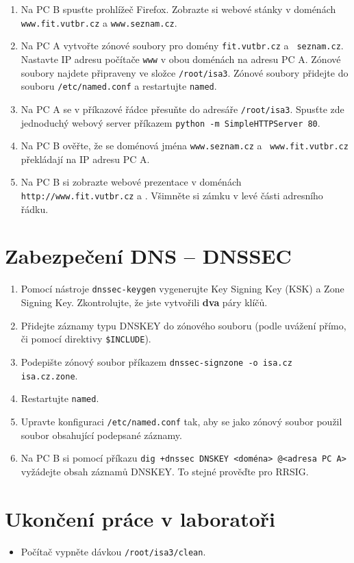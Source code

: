 \begin{enumerate}
  \item Na PC B spusťte prohlížeč Firefox. Zobrazte si webové stánky v
    doménách {\tt www.fit.vutbr.cz} a {\tt www.seznam.cz}.

  \item Na PC A vytvořte zónové soubory pro domény {\tt fit.vutbr.cz} a {\tt
    seznam.cz}. Nastavte IP adresu počítače {\tt www} v obou doménách na adresu
    PC A. Zónové soubory najdete připraveny ve složce {\tt /root/isa3}. Zónové
    soubory přidejte do souboru {\tt /etc/named.conf} a restartujte
    {\tt named}.

  \item Na PC A se v příkazové řádce přesuňte do adresáře {\tt /root/isa3}.
    Spusťte zde jednoduchý webový server příkazem {\tt python -m
    SimpleHTTPServer 80}.

  \item Na PC B ověřte, že se doménová jména {\tt www.seznam.cz} a {\tt
    www.fit.vutbr.cz} překládají na IP adresu PC A.

  \item Na PC B si zobrazte webové prezentace v doménách {\tt http://www.fit.vutbr.cz}
    a . Všimněte si zámku v levé části adresního řádku.

\end{enumerate}

\section{Zabezpečení DNS -- DNSSEC}

\begin{enumerate}

  \item Pomocí nástroje {\tt dnssec-keygen} vygenerujte Key Signing Key (KSK) a Zone Signing Key. Zkontrolujte, že
    jste vytvořili \textbf{dva} páry klíčů.

  \item Přidejte záznamy typu DNSKEY do zónového souboru (podle uvážení přímo,
    či pomocí direktivy \verb|$INCLUDE|).

  \item Podepište zónový soubor příkazem {\tt dnssec-signzone -o isa.cz isa.cz.zone}.

  \item Restartujte {\tt named}.
  
  \item Upravte konfiguraci {\tt /etc/named.conf} tak, aby se jako zónový
    soubor použil soubor obsahující podepsané záznamy.

  \item Na PC B si pomocí příkazu {\tt dig +dnssec DNSKEY <doména> @<adresa PC A>} vyžádejte obsah záznamů
    DNSKEY. To stejné prověďte pro RRSIG.

\end{enumerate}


\section{Ukončení práce v laboratoři}
\begin{itemize}
  \item Počítač vypněte dávkou {\tt /root/isa3/clean}.
\end{itemize}
